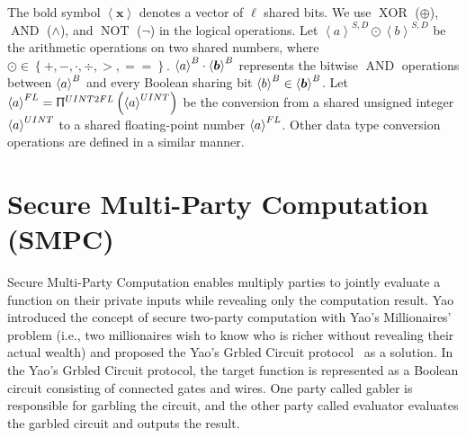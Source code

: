 The bold symbol $\left\langle \boldsymbol{x}\right\rangle $ denotes a vector of $\ell$ shared bits.
We use $\operatorname{XOR}$ ($\oplus $), $\operatorname{AND}$ ($\land $), and $\operatorname{NOT}$ ($\neg$) in the logical operations.
Let $\left\langle {a}\right\rangle^{S,D} \odot \left\langle {b}\right\rangle^{S,D}$ be the arithmetic operations on two shared numbers, where $\odot\in\left\{+, -, \cdot, \div, >, ==\right\} $. $\left\langle a\right\rangle ^{B} \cdot \left\langle \boldsymbol{b}\right\rangle ^{B}$ represents the bitwise $\operatorname{AND}$ operations between $\left\langle a\right\rangle ^{B}$ and every Boolean sharing bit $\left\langle b\right\rangle^{B} \in\left\langle \boldsymbol{b}\right\rangle ^{B}$.
Let $\left\langle {a}\right\rangle ^{FL}=\Uppi^{UINT2FL}\left(\left\langle {a}\right\rangle ^{UINT}\right) $ be the conversion from a shared unsigned integer $\left\langle {a}\right\rangle ^{UINT}$ to a shared floating-point number $\left\langle {a}\right\rangle ^{FL}$. Other data type conversion operations are defined in a similar manner.


\section{Secure Multi-Party Computation (SMPC)}
\label{sec:secureMultipartyComputation}
Secure Multi-Party Computation enables multiply parties to jointly evaluate a function on their private inputs while revealing only the computation result. Yao~\cite{yao1982protocols} introduced the concept of secure two-party computation with Yao's Millionaires' problem (i.e., two millionaires wish to know who is richer without revealing their actual wealth) and proposed the Yao's Grbled Circuit protocol~\cite{yao1986generate} as a solution.
In the Yao's Grbled Circuit protocol, the target function is represented as a Boolean circuit consisting of connected gates and wires. One party called gabler is responsible for garbling the circuit, and the other party called evaluator evaluates the garbled circuit and outputs the result.

